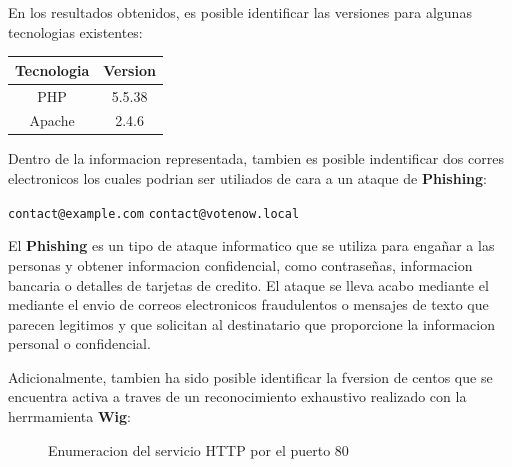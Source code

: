 \documentclass[a4paper]{article} %
\begin{document}
  En los resultados obtenidos, es posible identificar las versiones para algunas tecnologias existentes:

  \vspace{0.4cm}
  \centering
  
  \begin{tabular}{ c | c}
    \textbf{Tecnologia} & \textbf{Version}\\
    \hline
    PHP & 5.5.38\\
    Apache & 2.4.6
  \end{tabular}
  \vspace{0.4cm}

  \justifying

  Dentro de la informacion representada, tambien es posible indentificar dos corres electronicos los cuales podrian ser utiliados de cara a un ataque de \textbf{Phishing}:

  \vspace{0.3cm}

  \begin{center}
    \texttt{contact@example.com} \qquad \texttt{contact@votenow.local}
    
  \end{center}

  \vspace{0.3cm}

  El \textbf{Phishing} es un tipo de ataque informatico que se utiliza para engañar a las personas y obtener informacion confidencial, como contraseñas, informacion bancaria o detalles de tarjetas de credito.
  El ataque se lleva acabo mediante el mediante el envio de correos electronicos fraudulentos o mensajes de texto que parecen legitimos y que solicitan al destinatario que proporcione la informacion personal o confidencial.

  Adicionalmente, tambien ha sido posible identificar la fversion de centos que se encuentra activa a traves de un reconocimiento exhaustivo realizado con la herrmamienta \textbf{Wig}:

  \vspace{0.3cm}

  \begin{figure}[h]

    \centering
    \setlength{\fboxrule}{1.8pt}
      \caption{Enumeracion del servicio HTTP por el puerto 80}
  \end{figure}
\end{document}
